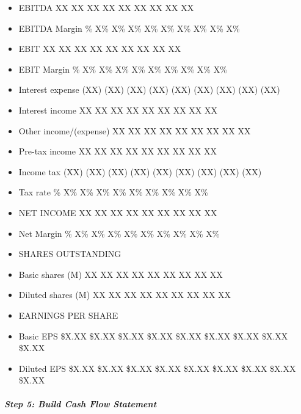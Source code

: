 \documentclass[11pt]{article}
\begin{document}
\begin{itemize}[leftmargin=*,itemsep=2pt,topsep=2pt]
\item {} EBITDA XX XX XX XX XX XX XX XX XX
\item {} EBITDA Margin \% X\% X\% X\% X\% X\% X\% X\% X\% X\%
\item {} EBIT XX XX XX XX XX XX XX XX XX
\item {} EBIT Margin \% X\% X\% X\% X\% X\% X\% X\% X\% X\%
\item {} Interest expense (XX) (XX) (XX) (XX) (XX) (XX) (XX) (XX) (XX)
\item {} Interest income XX XX XX XX XX XX XX XX XX
\item {} Other income/(expense) XX XX XX XX XX XX XX XX XX
\item {} Pre-tax income XX XX XX XX XX XX XX XX XX
\item {} Income tax (XX) (XX) (XX) (XX) (XX) (XX) (XX) (XX) (XX)
\item {} Tax rate \% X\% X\% X\% X\% X\% X\% X\% X\% X\%
\item {} NET INCOME XX XX XX XX XX XX XX XX XX
\item {} Net Margin \% X\% X\% X\% X\% X\% X\% X\% X\% X\%
\item {} SHARES OUTSTANDING
\item {} Basic shares (M) XX XX XX XX XX XX XX XX XX
\item {} Diluted shares (M) XX XX XX XX XX XX XX XX XX
\item {} EARNINGS PER SHARE
\item {} Basic EPS \$X.XX \$X.XX \$X.XX \$X.XX \$X.XX \$X.XX \$X.XX \$X.XX \$X.XX
\item {} Diluted EPS \$X.XX \$X.XX \$X.XX \$X.XX \$X.XX \$X.XX \$X.XX \$X.XX \$X.XX
\end{itemize}

\subparagraph{Step 5: Build Cash Flow Statement}\mbox{}\par
\end{document}

